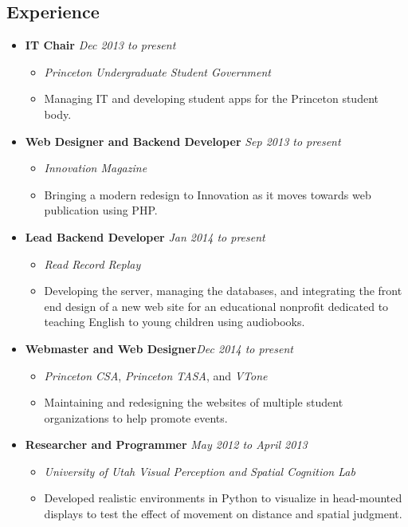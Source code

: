 \documentclass[11pt]{article}
\begin{document}
\subsection*{\textbf{Experience}}

\begin{itemize}[nolistsep,topsep=0pt, label=]
\itemsep0.33em
\item \textbf{IT Chair}  \hfill \emph{Dec 2013 to present}
\begin{itemize}[nolistsep,topsep=0pt, label=]
\item \emph{Princeton Undergraduate Student Government} 
\item Managing IT and developing student apps for the Princeton student body.
\end{itemize}

\item \textbf{Web Designer and Backend Developer} \hfill\emph{Sep 2013 to present}
\begin{itemize}[nolistsep,topsep=0pt, label=]
\item \emph{Innovation Magazine}  
\item Bringing a modern redesign to Innovation as it moves towards web publication using PHP.
\end{itemize}

\item \textbf{Lead Backend Developer}  \hfill\emph{Jan 2014 to present}
\begin{itemize}[nolistsep,topsep=0pt, label=]
\item \emph{Read Record Replay}
\item Developing the server, managing the databases, and integrating the front end design of a new web site for an educational nonprofit dedicated to teaching English to young children using audiobooks.
\end{itemize}

\item \textbf{Webmaster and Web Designer}\hfill \emph{Dec 2014 to present}
\begin{itemize}[nolistsep,topsep=0pt, label=]
\item \emph{Princeton CSA}, \emph{Princeton TASA}, and \emph{VTone}
\item Maintaining and redesigning the websites of multiple student organizations to help promote events.
\end{itemize}

\item \textbf{Researcher and Programmer} \hfill\emph{May 2012 to April 2013}
\begin{itemize}[nolistsep,topsep=0pt, label=]
\item \emph{University of Utah Visual Perception and Spatial Cognition Lab}
\item Developed realistic environments in Python to visualize in head-mounted displays to test the effect of movement on distance and spatial judgment.\end{itemize}


\end{itemize}
\end{document}
